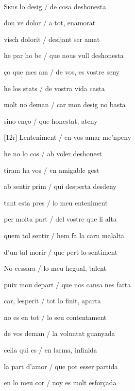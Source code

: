 \documentclass[12pt]{article}
\renewcommand{\espaiAbansEtiquetaPoema}{\vspace{0ex}}
\begin{document}
\begin{estrofa}

\espaiAbansEtiquetaPoema

\\

\end{estrofa}


\begin{estrofa}

 S\textsc{e}ns lo desig / de cosa deshonesta

 don ve dolor / a tot, enamorat

 visch dolorit / desijant ser amat

 he par ho be / que nous vull deshonesta

 \c{c}o que mes am / de vos, es vostre seny

 he los stats / de vostra vida casta

 molt no deman / car mon desig no basta

 sino en\c{c}o / que honestat, ateny

\end{estrofa}



\begin{estrofa}

 [12r] Lenteniment / en vos amar me'npeny

 he no lo cos / ab voler deshonest

 tiram ha vos / vn amigable gest

 ab sentir prim / qui desperta desdeny

 tant esta pres / lo meu enteniment

 per molta part / del vostre que li alta

 quem tol sentir / hem fa la carn malalta

 d'un tal morir / que pert lo sentiment

\end{estrofa}



\begin{estrofa}

 No cessara / lo meu hegual, talent

 puix mou depart / que nos cansa nes farta

 car, lesperit / tot lo finit, aparta

 no es en tot / lo seu contentament

 de vos deman / la voluntat guanyada

 cella qui es / en larma, infinida

 la part d'amor / que pot esser partida

 en lo meu cor / noy es molt esfor\c{c}ada

\end{estrofa}
\end{document}
